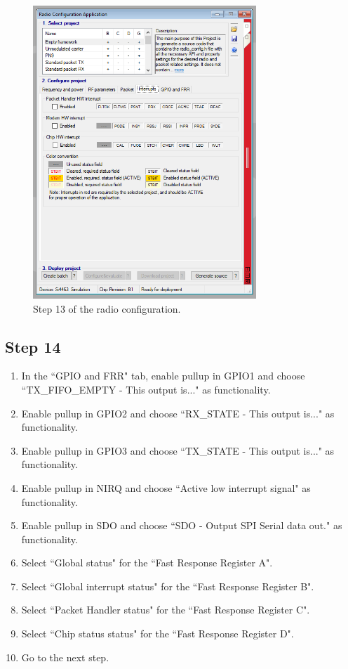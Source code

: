 \documentclass[12pt]{book}
\begin{document}
\begin{appendices}
\begin{figure}[!h]
	\begin{center}
		\includegraphics[width=0.75\textwidth]{figures/wds-tutorial-13.png}
		\caption{Step 13 of the radio configuration.}
		\label{fig:wds-tutorial-step-13}
	\end{center}
\end{figure}

\subsection{Step 14}

\begin{enumerate}
    \item In the ``GPIO and FRR" tab, enable pullup in GPIO1 and choose ``TX\_FIFO\_EMPTY - This output is..." as functionality.
    \item Enable pullup in GPIO2 and choose ``RX\_STATE - This output is..." as functionality.
    \item Enable pullup in GPIO3 and choose ``TX\_STATE - This output is..." as functionality.
    \item Enable pullup in NIRQ and choose ``Active low interrupt signal" as functionality.
    \item Enable pullup in SDO and choose ``SDO - Output SPI Serial data out." as functionality.
    \item Select ``Global status" for the ``Fast Response Register A".
    \item Select ``Global interrupt status" for the ``Fast Response Register B".
    \item Select ``Packet Handler status" for the ``Fast Response Register C".
    \item Select ``Chip status status" for the ``Fast Response Register D".
    \item Go to the next step.
\end{enumerate}


\end{appendices}
\end{document}
